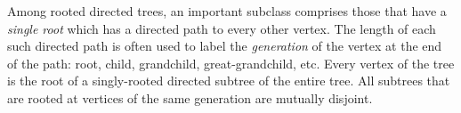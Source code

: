 \bigskip


Among rooted directed trees, an important subclass comprises those that have a {\em single root} which has a directed path to every other vertex.  The length of each such directed path is often used to label the {\it generation} of the vertex at the end of the path: root, child, grandchild,
great-grandchild, etc.  Every vertex of the tree is the root of a singly-rooted directed subtree of the entire tree.  All subtrees that are rooted at vertices of the same generation are mutually disjoint.

\bigskip

 

\noindent {}

\bigskip


